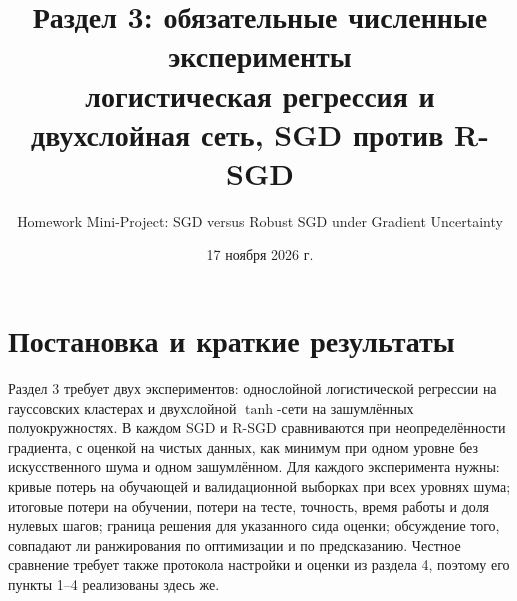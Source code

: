 \documentclass[11pt,a4paper]{article}
\title{Раздел 3: обязательные численные эксперименты\\[0.2em]
\large логистическая регрессия и двухслойная сеть, SGD против R-SGD}
\author{Homework Mini-Project: SGD versus Robust SGD under Gradient Uncertainty}
\date{17 ноября 2026 г.}
\begin{document}
\maketitle

\section*{Постановка и краткие результаты}

Раздел 3 требует двух экспериментов: однослойной логистической регрессии на гауссовских
кластерах и двухслойной $\tanh$-сети на зашумлённых полуокружностях. В каждом SGD и R-SGD
сравниваются при неопределённости градиента, с оценкой на чистых данных, как минимум при
одном уровне без искусственного шума и одном зашумлённом. Для каждого эксперимента нужны:
кривые потерь на обучающей и валидационной выборках при всех уровнях шума; итоговые
потери на обучении, потери на тесте, точность, время работы и доля нулевых шагов; граница
решения для указанного сида оценки; обсуждение того, совпадают ли ранжирования по
оптимизации и по предсказанию. Честное сравнение требует также протокола настройки и
оценки из раздела 4, поэтому его пункты 1--4 реализованы здесь же.
\end{document}
